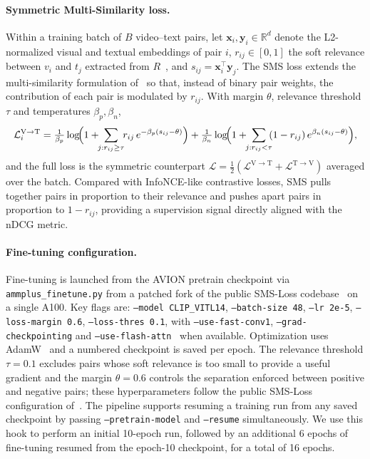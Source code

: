 \paragraph{Symmetric Multi-Similarity loss.}
Within a training batch of $B$ video--text pairs, let $\mathbf{x}_i, \mathbf{y}_i \in \mathbb{R}^d$ denote the L2-normalized visual and textual embeddings of pair $i$, $r_{ij} \in [0,1]$ the soft relevance between $v_i$ and $t_j$ extracted from $R$~\cite{wray2021semantic}, and $s_{ij} = \mathbf{x}_i^{\!\top}\mathbf{y}_j$. The SMS loss extends the multi-similarity formulation of~\cite{wang2019multisimilarity} so that, instead of binary pair weights, the contribution of each pair is modulated by $r_{ij}$. With margin $\theta$, relevance threshold $\tau$ and temperatures $\beta_p, \beta_n$,
\begin{equation}
\mathcal{L}^{\mathrm{V\to T}}_i = \tfrac{1}{\beta_p}\log\!\Bigl(1 + \!\!\sum_{j: r_{ij}\ge \tau}\!\! r_{ij}\,e^{-\beta_p(s_{ij}-\theta)}\Bigr) + \tfrac{1}{\beta_n}\log\!\Bigl(1 + \!\!\sum_{j: r_{ij}<\tau}\!\! (1-r_{ij})\,e^{\beta_n(s_{ij}-\theta)}\Bigr),
\label{eq:sms}
\end{equation}
and the full loss is the symmetric counterpart $\mathcal{L} = \tfrac{1}{2}(\mathcal{L}^{\mathrm{V\to T}} + \mathcal{L}^{\mathrm{T\to V}})$ averaged over the batch. Compared with InfoNCE-like contrastive losses, SMS pulls together pairs in proportion to their relevance and pushes apart pairs in proportion to $1 - r_{ij}$, providing a supervision signal directly aligned with the nDCG metric.

\paragraph{Fine-tuning configuration.}
Fine-tuning is launched from the AVION pretrain checkpoint via \texttt{ammplus\_finetune.py} from a patched fork of the public SMS-Loss codebase~\cite{wang2024smsloss_repo} on a single A100. Key flags are: \texttt{--model CLIP\_VITL14}, \texttt{--batch-size 48}, \texttt{--lr 2e-5}, \texttt{--loss-margin 0.6}, \texttt{--loss-thres 0.1}, with \texttt{--use-fast-conv1}, \texttt{--grad-checkpointing} and \texttt{--use-flash-attn}~\cite{dao2022flashattention} when available. Optimization uses AdamW~\cite{loshchilov2019adamw} and a numbered checkpoint is saved per epoch. The relevance threshold $\tau = 0.1$ excludes pairs whose soft relevance is too small to provide a useful gradient and the margin $\theta = 0.6$ controls the separation enforced between positive and negative pairs; these hyperparameters follow the public SMS-Loss configuration of~\cite{wang2024symmetricmultisimilaritylossepickitchens100}. The pipeline supports resuming a training run from any saved checkpoint by passing \texttt{--pretrain-model} and \texttt{--resume} simultaneously. We use this hook to perform an initial 10-epoch run, followed by an additional 6 epochs of fine-tuning resumed from the epoch-10 checkpoint, for a total of 16 epochs.

